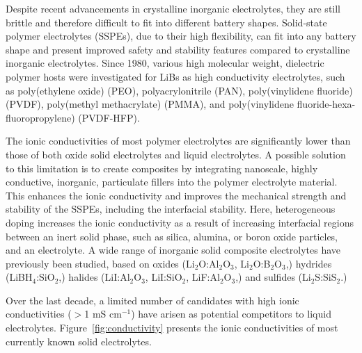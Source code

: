 \documentclass[../main.tex]{subfiles}
\begin{document}
Despite recent advancements in crystalline inorganic electrolytes, they are still brittle and therefore difficult to fit into different battery shapes. Solid-state polymer electrolytes (SSPEs), due to their high flexibility, can fit into any battery shape and present improved safety and stability features compared to crystalline inorganic electrolytes.\cite{DIRICAN201927} Since 1980, various high molecular weight, dielectric polymer hosts were investigated for LiBs as high conductivity electrolytes, such as poly(ethylene oxide) (PEO),\cite{fenton1973} polyacrylonitrile (PAN),\cite{abraham1990,dautzenberg1994} poly(vinylidene fluoride) (PVDF), \cite{arcella1999,kataoka2000,li2016} poly(methyl methacrylate) (PMMA), \cite{appetecchi1995,bohnke1993} and poly(vinylidene fluoride-hexa-fluoropropylene) (PVDF-HFP).\cite{abbrent2001,park2008,yang2014}

The ionic conductivities of most polymer electrolytes are significantly lower than those of both oxide solid electrolytes and liquid electrolytes.\cite{zhou2016} A possible solution to this limitation is to create composites by integrating nanoscale, highly conductive, inorganic, particulate fillers into the polymer electrolyte material.\cite{DIRICAN201927} This enhances the ionic conductivity and improves the mechanical strength and stability of the SSPEs, including the interfacial stability.\cite{D0SC03121F} Here, heterogeneous doping increases the ionic conductivity as a result of increasing interfacial regions between an inert solid phase, such as silica, alumina, or boron oxide particles, and an electrolyte.\cite{uvarov2011} A wide range of inorganic solid composite electrolytes have previously been studied, based on oxides (Li$_{2}$O:Al$_{2}$O$_{3}$,\cite{B300908D} Li$_{2}$O:B$_{2}$O$_{3}$,\cite{Heitjans_2003,Indris2000,Indris2002}) hydrides (LiBH$_{4}$:SiO$_{2}$,\cite{blanchard2015}) halides (LiI:Al$_{2}$O$_{3}$,\cite{liang1973} LiI:SiO$_{2}$,\cite{phipps1983} LiF:Al$_{2}$O$_{3}$,\cite{uvarov1992}) and sulfides (Li$_{2}$S:SiS$_{2}$.\cite{pradel1986})

Over the last decade, a limited number of candidates with high ionic conductivities ($>$1 mS cm$^{-1}$) have arisen as potential competitors to liquid electrolytes.\cite{kanno_synthesis_2000, murayama_synthesis_2002, murayama_material_2004, minafra_influence_2019,bron_li_2013,whiteley_empowering_2014,huang_superionic_2019,yamane_crystal_2007,homma_crystal_2011} Figure~\ref{fig:conductivity} presents the ionic conductivities of most currently known solid electrolytes.\cite{Zhang2018se_review}
\end{document}
